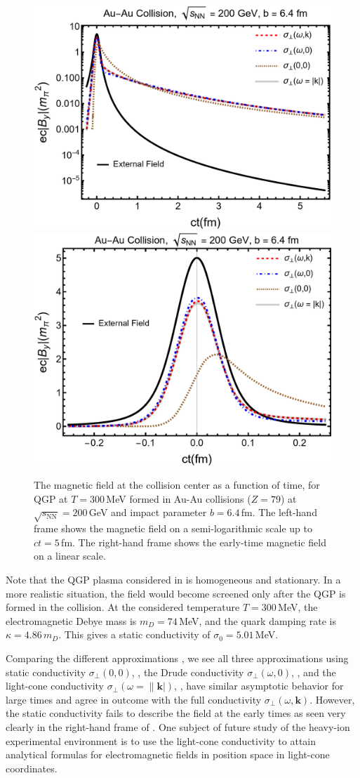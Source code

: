 \begin{figure}
\includegraphics[width=0.50\linewidth]{plots/bf100.png}
\includegraphics[width=0.47\linewidth]{plots/bf100lin.png}
\caption{The magnetic field at the collision center as a function of time, for QGP at $T = 300$\,MeV formed in Au-Au collisions ($Z=79$) at $\sqrt{s_\text{NN}} = 200$\,GeV and impact parameter $b = 6.4\,$fm. The left-hand frame shows the magnetic field on a semi-logarithmic scale up to $ct = 5$\,fm. The right-hand frame shows the early-time magnetic field on a linear scale. \label{fig:bfcomp}}
\end{figure}

Note that the QGP plasma considered in  is homogeneous and stationary. In a more realistic situation, the field would become screened only after the QGP is formed in the collision. At the considered temperature $T = 300$\,MeV, the electromagnetic Debye mass is $m_D = 74\,$MeV, and the quark damping rate is $\kappa = 4.86\,m_D$. This gives a static conductivity of $\sigma_0 = 5.01\,$MeV. 

Comparing the different approximations   , we see  all three approximations using static conductivity $\sigma_\bot(0,0)$, , the Drude conductivity $\sigma_\bot(\omega,0)$, ,  and the light-cone conductivity $\sigma_\bot(\omega=\|\boldsymbol{k}|)$, ,  have similar asymptotic behavior for large times and agree in outcome with the full conductivity $\sigma_\perp(\omega,\boldsymbol{k})$. However, the static conductivity fails to describe the field at the early times as seen very clearly in the right-hand frame of . One subject of future study of the heavy-ion experimental environment is to use the light-cone conductivity to attain analytical formulas for electromagnetic fields in position space in light-cone coordinates.

